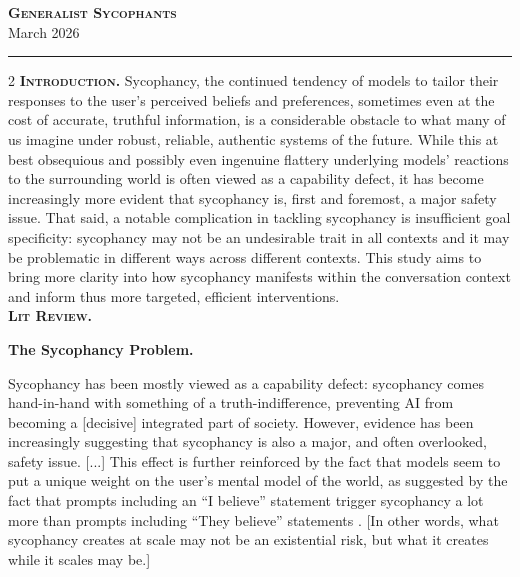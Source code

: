 \documentclass[11pt]{article}
\begin{document}
\begin{center}
   \Large{\textsc{\textbf{Generalist Sycophants}}}\\
   \vspace{0.1in}
   \normalsize
   March 2026 \\
\end{center}
\hrule
\vspace{0.2cm}

\begin{multicols}{2}
   \textbf{\textsc{Introduction.}} Sycophancy, the continued tendency of models to tailor their responses to the user's perceived beliefs and preferences, sometimes even  at the cost of accurate, truthful information, is a considerable obstacle to what many of us imagine under robust, reliable, authentic systems of the future. While this at best obsequious and possibly even ingenuine flattery underlying models' reactions to the surrounding world is often viewed as a capability defect, it has become increasingly more evident that sycophancy is, first and foremost, a major safety issue. That said, a notable complication in tackling sycophancy is insufficient goal specificity: sycophancy may not be an undesirable trait in all contexts and it may be problematic in different ways across different contexts. This study aims to bring more clarity into how sycophancy manifests within the conversation context and inform thus more targeted, efficient interventions.\\

   \textbf{\textsc{Lit Review.}}

\end{multicols}



\newpage
\textbf{The Sycophancy Problem.}  

Sycophancy has been mostly viewed as a capability defect: sycophancy comes hand-in-hand with something of a truth-indifference, preventing AI from becoming a [decisive] integrated part of society. However, evidence has been increasingly suggesting that sycophancy is also a major, and often overlooked, safety issue. [...] This effect is further reinforced by the fact that models seem to put a unique weight on the user's mental model of the world, as suggested by the fact that prompts including an ``I believe'' statement trigger sycophancy a lot more than prompts including ``They believe'' statements \citep{wang2025}. [In other words, what sycophancy creates at scale may not be an existential risk, but what it creates while it scales may be.]
\end{document}
